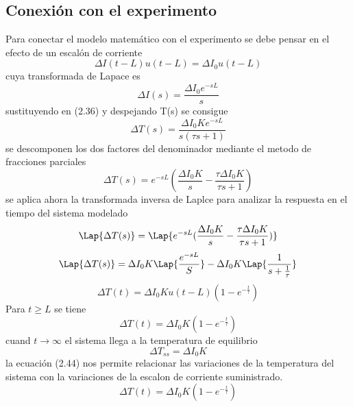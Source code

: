 \subsection{Conexión con el experimento}
Para conectar el modelo matemático con el experimento se debe pensar en el efecto de un escalón de corriente 
\begin{equation}
    \Delta I(t-L)u(t-L)=\Delta I_{0}u(t-L)
\end{equation} 
cuya transformada de Lapace es 
\begin{equation}
    \Delta I(s)= \frac{\Delta I_{0}e^{-sL}}{s}
\end{equation}
sustituyendo en (2.36) y despejando T(s) se consigue  
\begin{equation}
    \Delta T(s) = \frac{\Delta I_{0}Ke^{-sL}}{s(\tau s +1)}
\end{equation}
se descomponen los dos factores del denominador mediante el metodo de fracciones parciales
\begin{equation}
    \Delta T(s) = e^{-sL}(\frac{\Delta I_{0}K}{s} - \frac{\tau \Delta I_{0}K}{\tau s +1})
\end{equation}
se aplica ahora la transformada inversa de Laplce para analizar la respuesta en el tiempo del sistema modelado 
\begin{equation}
   \Lap{ \Delta T(s) }= \Lap {e^{-sL}(\frac{\Delta I_{0}K}{s} - \frac{\tau \Delta I_{0}K}{\tau s +1})}
\end{equation}
\begin{equation}
     \Lap{ \Delta T(s) } = \Delta I_{0}K \Lap{\frac{e^{-sL}}{S}} - \Delta I_{0}K \Lap{\frac{1}{s+\frac{1}{\tau}}}
\end{equation}
\begin{equation}
    \Delta T(t) = \Delta I_{0}Ku(t-L)(1-e^{-\frac{t}{\tau}})
\end{equation}
 Para $t \geq L$ se tiene 
 \begin{equation}
    \Delta T(t) = \Delta I_{0}K(1-e^{-\frac{t}{\tau}})
\end{equation}
cuand $t \xrightarrow{}\infty$ el sistema llega a la temperatura de equilibrio 
\begin{equation}
    \Delta T_{ss} =\Delta I_{0}K
\end{equation}
la ecuación (2.44) nos permite relacionar las variaciones de la temperatura del sistema con la variaciones de la   escalon de corriente suministrado.
\begin{equation}
    \Delta T(t) =\Delta I_{0}K(1-e^{-\frac{t}{\tau}})
\end{equation}

